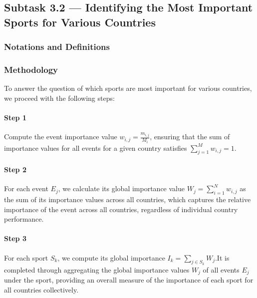 \documentclass{mcmthesis}
\begin{document}
\subsection{Subtask 3.2 --- Identifying the Most Important Sports for Various Countries}


\subsubsection{Notations and Definitions}

\subsubsection{Methodology}
To answer the question of which sports are most important for various countries, we proceed with the following steps:

\paragraph{Step 1}

Compute the event importance value $w_{i,j} = \frac{m_{i,j}}{M_i}$, ensuring that the sum of importance values for all events for a given country satisfies $\sum_{j=1}^M w_{i,j} = 1$.

\paragraph{Step 2}
For each event $E_j$, we calculate its global importance value $W_j = \sum_{i=1}^N w_{i,j}$ as the sum of its importance values across all countries, which captures the relative importance of the event across all countries, regardless of individual country performance.

\paragraph{Step 3}
For each sport $S_k$, we compute its global importance $I_k = \sum_{j \in S_k} W_j$.It is completed through aggregating the global importance values $W_j$ of all events $E_j$ under the sport, providing an overall measure of the importance of each sport for all countries collectively.
\end{document}
